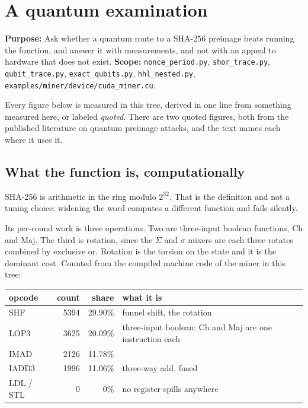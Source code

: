 
\chapter{A quantum examination}

\textbf{Purpose:} Ask whether a quantum route to a SHA-256 preimage beats running the function, and
answer it with measurements, and not with an appeal to hardware that does not exist.
\textbf{Scope:} \texttt{nonce\_period.py}, \texttt{shor\_trace.py}, \texttt{qubit\_trace.py},
\texttt{exact\_qubits.py}, \texttt{hhl\_nested.py}, \texttt{examples/miner/device/cuda\_miner.cu}.

Every figure below is measured in this tree, derived in one line from something measured here, or
labeled \emph{quoted}. There are two quoted figures, both from the published literature on quantum
preimage attacks, and the text names each where it uses it.

\section{What the function is, computationally}

SHA-256 is arithmetic in the ring modulo \(2^{32}\). That is the definition and not a tuning
choice: widening the word computes a different function and fails silently.

Its per-round work is three operations. Two are three-input boolean functions, \(\mathrm{Ch}\) and
\(\mathrm{Maj}\). The third is rotation, since the \(\Sigma\) and \(\sigma\) mixers are each three
rotates combined by exclusive or. Rotation is the torsion on the state and it is the dominant cost.
Counted from the compiled machine code of the miner in this tree:

\begin{center}
\begin{tabular}{lrrl}
\toprule
opcode & count & share & what it is \\
\midrule
SHF       & 5394 & 29.90\% & funnel shift, the rotation \\
LOP3      & 3625 & 20.09\% & three-input boolean: Ch and Maj are one instruction each \\
IMAD      & 2126 & 11.78\% & \\
IADD3     & 1996 & 11.06\% & three-way add, fused \\
LDL / STL & 0    & 0\%     & no register spills anywhere \\
\bottomrule
\end{tabular}
\end{center}

